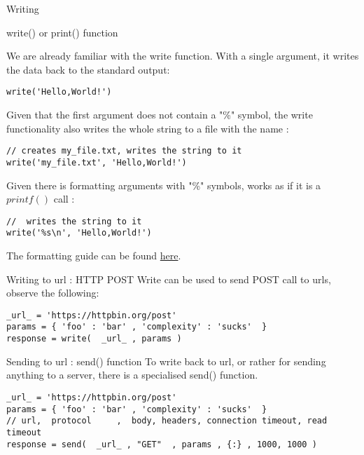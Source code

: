 \begin{section}{Writing}

\begin{subsection}{write() or print() function}

We are already familiar with the write function.
With a single argument, it writes the data back to the standard output:

\begin{lstlisting}[style=JexlStyle]
write('Hello,World!')
\end{lstlisting}

Given that the first argument does not contain a "\%" symbol,
the write functionality also writes the whole string to a file
with the name :
\begin{lstlisting}[style=JexlStyle]
// creates my_file.txt, writes the string to it 
write('my_file.txt', 'Hello,World!')
\end{lstlisting}

Given there is formatting arguments with "\%" symbols, 
works as if it is a $printf()$ call :
\begin{lstlisting}[style=JexlStyle]
//  writes the string to it 
write('%s\n', 'Hello,World!')
\end{lstlisting}
The formatting guide can be found 
\href{https://sharkysoft.com/archive/printf/docs/javadocs/lava/clib/stdio/doc-files/specification.htm}{here}. 
\end{subsection}

\begin{subsection}{Writing to url : HTTP POST}
Write can be used to send POST call to urls, observe the following:
\begin{lstlisting}[style=JexlStyle]
_url_ = 'https://httpbin.org/post'
params = { 'foo' : 'bar' , 'complexity' : 'sucks'  }
response = write(  _url_ , params )
\end{lstlisting}
\end{subsection}

\begin{subsection}{Sending to url : send() function}
To write back to url, or rather for sending anything to a server,
there is a specialised send() function.

\begin{lstlisting}[style=JexlStyle]
_url_ = 'https://httpbin.org/post'
params = { 'foo' : 'bar' , 'complexity' : 'sucks'  }
// url,  protocol     ,  body, headers, connection timeout, read timeout  
response = send(  _url_ , "GET"  , params , {:} , 1000, 1000 )
\end{lstlisting}


\end{subsection}
\end{section}
